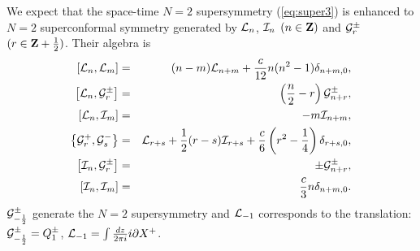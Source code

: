 \documentclass[a4paper,12pt]{article}
\begin{document}
We expect that the space-time $N=2$ supersymmetry (\ref{eq:super3}) is 
enhanced to $N=2$
superconformal symmetry generated by
${\cal L}_{n}$, ${\cal I}_{n}$ $(n\in {\bf Z})$ and
${\cal G}^{\pm}_{r}$ $(r\in {\bf Z}+{1\over2})$.
Their algebra is
\begin{eqnarray}
\left[{\cal L}_n,{\cal L}_m\right]&=&
(n-m){\cal L}_{n+m}+\frac{c}{12}n(n^2-1)\delta_{n+m,0},\nonumber\\
\left[{\cal L}_n,{\cal G}^{\pm}_r\right]&=&
\left(\frac{n}{2}-r\right){\cal G}^{\pm}_{n+r},\nonumber\\
\left[{\cal L}_n,{\cal I}_m\right]&=&
-m{\cal I}_{n+m},\nonumber\\
\left\{{\cal G}^+_r,{\cal G}^-_s\right\}&=&
{\cal L}_{r+s}+\frac{1}{2}(r-s){\cal I}_{r+s}
+\frac{c}{6}\left(r^2-\frac{1}{4}\right)\delta_{r+s,0},\nonumber\\
\left[{\cal I}_n,{\cal G}^{\pm}_r\right]&=&
\pm{\cal G}^{\pm}_{n+r},\nonumber\\
\left[{\cal I}_n,{\cal I}_m\right]&=&
\frac{c}{3}n\delta_{n+m,0}.
\end{eqnarray}
${\cal G}^{\pm}_{-{1\over2}}$ generate the $N=2$ supersymmetry and 
${\cal L}_{-1}$ corresponds to the translation:
${\cal G}^{\pm}_{-{1\over2}}=Q^{\pm}_{1}$, ${\cal L}_{-1}=
\int {dz\over 2\pi i}i\partial X^{+}$.
\end{document}
